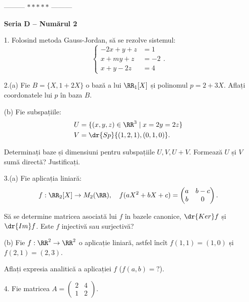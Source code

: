 \vspace{0.5cm}
\begin{center}
  --------- $\ast\ast\ast\ast\ast$ ---------
\end{center}
\vspace{0.5cm}

\textbf{Seria D -- Numărul 2}

1. Folosind metoda Gauss-Jordan, să se rezolve sistemul:
\[
  \begin{cases}
    -2x + y + z &= 1 \\
    x + my + z &= -2 \\
    x + y - 2z &= 4
  \end{cases}.
\]

\vspace{0.5cm}

2.(a) Fie $ B = \{ X, 1 + 2X \} $ o bază a lui $ \RR_1[X] $ și polinomul $ p = 2 + 3X $.
Aflați coordonatele lui $ p $ în baza $ B $.

(b) Fie subspațiile:
\begin{align*}
  U &= \{ (x, y, z) \in \RR^3 \mid x = 2y = 2z \} \\
  V &= \dr{Sp} \{ (1, 2, 1), (0, 1, 0) \}.
\end{align*}

Determinați baze și dimensiuni pentru subspațiile $ U, V, U + V $. Formează $ U $ și
$ V $ sumă directă? Justificați.

\vspace{0.5cm}

3.(a) Fie aplicația liniară:
\[
  f : \RR_2[X] \to M_2(\RR), \quad f(aX^2 + bX + c) = \begin{pmatrix} a & b - c \\ b & 0 \end{pmatrix}.
\]

Să se determine matricea asociată lui $ f $ în bazele canonice, $ \dr{Ker}f $ și $ \dr{Im}f $.
Este $ f $ injectivă sau surjectivă?

(b) Fie $ f : \RR^2 \to \RR^2 $ o aplicație liniară, astfel încît $ f(1, 1) = (1, 0) $ și
$ f(2, 1) = (2, 3) $.

Aflați expresia analitică a aplicației $ f $ ($ f(a, b) = ? $).

\vspace{0.5cm}

4. Fie matricea $ A = \begin{pmatrix} 2 & 4 \\ 1 & 2 \end{pmatrix} $.

